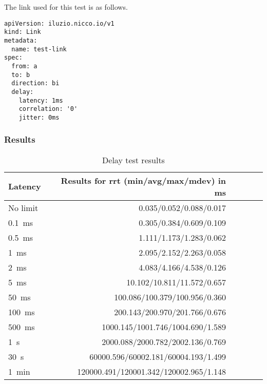The link used for this test is as follows.

\begin{verbatim}
apiVersion: iluzio.nicco.io/v1
kind: Link
metadata:
  name: test-link
spec:
  from: a
  to: b
  direction: bi
  delay:
    latency: 1ms
    correlation: '0'
    jitter: 0ms
\end{verbatim}

\subsubsection{Results}


\begin{table}[h]
  \centering
  \begin{tabular}{|l|r|r|c|c|c|}
    \hline
    Latency                 & Results for rrt (min/avg/max/mdev) in \si{\milli\second} \\
    \hline\hline
    No limit                & 0.035/0.052/0.088/0.017                                  \\ \hline
    \SI{0,1}{\milli\second} & 0.305/0.384/0.609/0.109                                  \\ \hline
    \SI{0,5}{\milli\second} & 1.111/1.173/1.283/0.062                                  \\ \hline
    \SI{1}{\milli\second}   & 2.095/2.152/2.263/0.058                                  \\ \hline
    \SI{2}{\milli\second}   & 4.083/4.166/4.538/0.126                                  \\ \hline
    \SI{5}{\milli\second}   & 10.102/10.811/11.572/0.657                               \\ \hline
    \SI{50}{\milli\second}  & 100.086/100.379/100.956/0.360                            \\ \hline
    \SI{100}{\milli\second} & 200.143/200.970/201.766/0.676                            \\ \hline
    \SI{500}{\milli\second} & 1000.145/1001.746/1004.690/1.589                         \\ \hline
    \SI{1}{\second}         & 2000.088/2000.782/2002.136/0.769                         \\ \hline
    \SI{30}{\second}        & 60000.596/60002.181/60004.193/1.499                      \\ \hline
    \SI{1}{\minute}         & 120000.491/120001.342/120002.965/1.148                   \\ \hline
  \end{tabular}
  \caption{Delay test results}
  \label{table:evaluation-delay}
\end{table}

